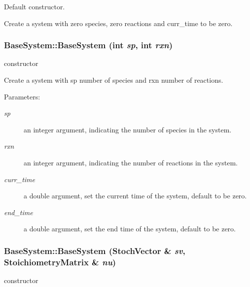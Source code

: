Default constructor. 

Create a system with zero species, zero reactions and curr\_\-time to be zero. \hypertarget{class_base_system_7f28308a370855646f1e0a3f65719c24}{
\subsubsection{\setlength{\rightskip}{0pt plus 5cm}BaseSystem::BaseSystem (int {\em sp}, \/  int {\em rxn})}}
\label{class_base_system_7f28308a370855646f1e0a3f65719c24}


constructor 

Create a system with sp number of species and rxn number of reactions. \begin{Desc}
\item[Parameters:]
\begin{description}
\item[{\em sp}]an integer argument, indicating the number of species in the system. \item[{\em rxn}]an integer argument, indicating the number of reactions in the system. \item[{\em curr\_\-time}]a double argument, set the current time of the system, default to be zero. \item[{\em end\_\-time}]a double argument, set the end time of the system, default to be zero. \end{description}
\end{Desc}
\hypertarget{class_base_system_8e6f4b7f9e6a955e45d07ed01754cbfa}{
\subsubsection{\setlength{\rightskip}{0pt plus 5cm}BaseSystem::BaseSystem ({\bf StochVector} \& {\em sv}, \/  {\bf StoichiometryMatrix} \& {\em nu})}}
\label{class_base_system_8e6f4b7f9e6a955e45d07ed01754cbfa}


constructor 

